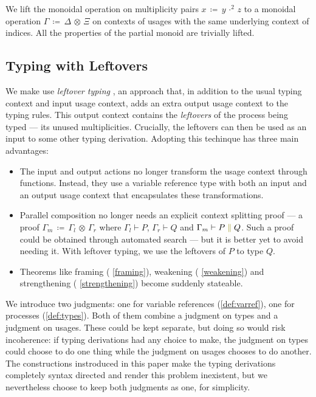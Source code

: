 \documentclass[a4paper,UKenglish,cleveref, autoref, thm-restate,authorcolumns]{lipics-v2019}
\theoremstyle{definition}
\newcommand{\constr}[1]{\textcolor{olive}{\operatorname{#1}}}
\newcommand{\comp}[2]{#1 \; \constr{\parallel} \; #2}
\newcommand{\opsquared}[3]{#1 \, \coloneqq \, #2 \, \cdot^2 \, #3}
\newcommand{\opctx}[3]{#1 \, \coloneqq \, #2 \, \otimes \, #3}
\begin{document}
\begin{note}
  We lift the monoidal operation on multiplicity pairs $\opsquared{x}{y}{z}$ to a monoidal operation $\opctx{\Gamma}{\Delta}{\Xi}$ on contexts of usages with the same underlying context of indices.
  All the properties of the partial monoid are trivially lifted.
\end{note}

\subsection{Typing with Leftovers}
\label{leftover-typing}

We make use \emph{leftover typing} \cite{}, an approach that, in addition to the usual typing context and input usage context, adds an extra output usage context to the typing rules.
This output context contains the \emph{leftovers} of the process being typed --- its unused multiplicities.
Crucially, the leftovers can then be used as an input to some other typing derivation.
Adopting this techinque has three main advantages:
\begin{itemize}
  \item
    The input and output actions no longer transform the usage context through functions.
    Instead, they use a variable reference type with both an input and an output usage context that encapsulates these transformations.
  \item
    Parallel composition no longer needs an explicit context splitting proof --- a proof $\opctx{\Gamma_m}{\Gamma_l}{\Gamma_r}$ where $\Gamma_l \vdash P$, $\Gamma_r \vdash Q$ and $\Gamma_m \vdash \comp{P}{Q}$.
    Such a proof could be obtained through automated search --- but it is better yet to avoid needing it.
    With leftover typing, we use the leftovers of $P$ to type $Q$.
  \item
    Theorems like framing ( \autoref{framing}), weakening ( \autoref{weakening}) and strengthening ( \autoref{strengthening}) become suddenly stateable.
\end{itemize}
  
We introduce two judgments: one for variable references (\autoref{def:varref}), one for processes (\autoref{def:types}).
Both of them combine a judgment on types and a judgment on usages.
These could be kept separate, but doing so would risk incoherence: if typing derivations had any choice to make, the judgment on types could choose to do one thing while the judgment on usages chooses to do another.
The constructions instroduced in this paper make the typing derivations completely syntax directed and render this problem inexistent, but we nevertheless choose to keep both judgments as one, for simplicity.
\end{document}
